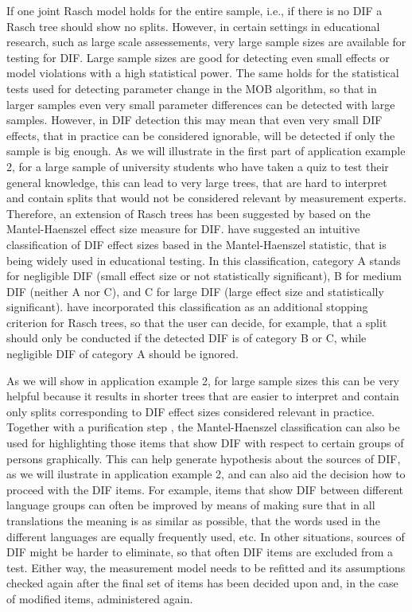 \documentclass[doc,floatsintext,natbib]{apa7}
\begin{document}
If one joint Rasch model holds for the entire sample, i.e., if there is no DIF a Rasch tree should show no splits. However, in certain settings in educational research, such as large scale assessements, very large sample sizes are available for testing for DIF. Large sample sizes are good for detecting even small effects or model violations with a high statistical power. The same holds for the statistical tests used for detecting parameter change in the MOB algorithm, so that in larger samples even very small parameter differences can be detected with large samples. However, in DIF detection this may mean that even very small DIF effects, that in practice can be considered ignorable, will be detected if only the sample is big enough. As we will illustrate in the first part of application example 2, for a large sample of university students  who have taken a quiz to test their general knowledge, this can lead to very large trees, that are hard to interpret and contain splits that would not be considered relevant by measurement experts. Therefore, an extension of Rasch trees has been suggested by \citet{HennyDeba23} based on the Mantel-Haenszel effect size measure for DIF. \citet{HolTha:1985} have suggested an intuitive classification of DIF effect sizes based in the Mantel-Haenszel statistic, that is being widely used in educational testing. In this classification, category A stands for negligible DIF (small effect size or not statistically significant), B for medium DIF (neither A nor C), and C for large DIF (large effect size and statistically significant). \citet{HennyDeba23} have incorporated this classification as an additional stopping criterion for Rasch trees, so that the user can decide, for example, that a split should only be conducted if the detected DIF is of category B or C, while negligible DIF of category A should be ignored. 

As we will show in application example 2, for large sample sizes this can be very helpful because it results in shorter trees that are easier to interpret and contain only splits corresponding to DIF effect sizes considered relevant in practice. Together with a purification step \citet[see][for details]{HennyDeba23}, the Mantel-Haenszel classification can also be used for highlighting those items that show DIF with respect to certain groups of persons graphically. This can help generate hypothesis about the sources of DIF, as we will ilustrate in application example 2, and can also aid the decision how to proceed with the DIF items. For example, items that show DIF between different language groups can often be improved by means of making sure that in all translations the meaning is as similar as possible, that the words used in the different languages are equally frequently used, etc. In other situations, sources of DIF might be harder to eliminate, so that often DIF items are excluded from a test. Either way, the measurement model needs to be refitted and its assumptions checked again after the final set of items has been decided upon and, in the case of modified items, administered again. 
\end{document}
